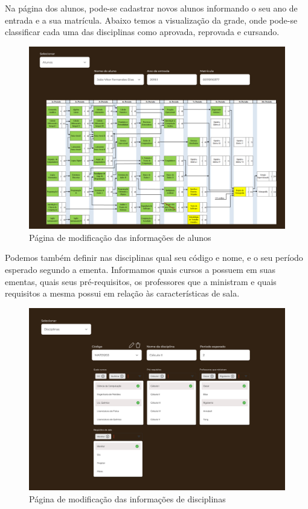     Na página dos alunos, pode-se cadastrar novos alunos informando o seu ano de entrada e a sua matrícula. Abaixo temos a visualização da grade, onde pode-se classificar cada uma das disciplinas como aprovada, reprovada e cursando.

    \begin{figure}[htbp]\centering
        \caption{\label{fig:CRUD_alunos} Página de modificação das informações de alunos}
        \includegraphics[scale=0.8]{files/img/Prototipo/CRUD_alunos.png}
    \end{figure} %

    Podemos também definir nas disciplinas qual seu código e nome, e o seu período esperado segundo a ementa. Informamos quais cursos a possuem em suas ementas, quais seus pré-requisitos, os professores que a ministram e quais requisitos a mesma possui em relação às características de sala.

    \begin{figure}[htbp]\centering
        \caption{\label{fig:CRUD_disciplinas} Página de modificação das informações de disciplinas}
        \includegraphics[scale=0.8]{files/img/Prototipo/CRUD_disciplinas.png}
    \end{figure} %

